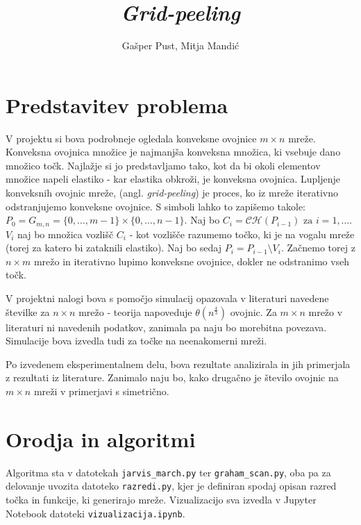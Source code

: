 \documentclass[a4paper]{article}
\title{\textit{Grid-peeling}}
\author{Gašper Pust, Mitja Mandić}
\begin{document}
\begin{titlepage}
 \maketitle
\end{titlepage}

\section{Predstavitev problema}
V projektu si bova podrobneje ogledala konveksne ovojnice $m \times n$ mreže. Konveksna ovojnica množice je najmanjša konveksna množica, ki vsebuje dano množico točk.
Najlažje si jo predstavljamo tako, kot da bi okoli elementov množice napeli elastiko - kar elastika obkroži, je konveksna ovojnica. Lupljenje konveksnih ovojnic mreže,
(angl. \textit{grid-peeling}) je proces, ko iz mreže iterativno odstranjujemo konveksne ovojnice. S simboli lahko to zapišemo takole:
$ P_{0} = G_{m,n} = \{0,\ldots, m-1\} \times \{0, \ldots, n-1\}$. Naj bo $C_{i} = \mathcal{C}\mathcal{H}(P_{i-1}) \text{ za } i = 1, \ldots$. $V_{i}$ naj bo množica vozlišč $C_{i}$
- kot vozlišče razumemo točko, ki je na vogalu mreže (torej za katero bi zataknili elastiko). Naj bo sedaj $P_{i} = P_{i-1} \setminus V_{i}$. Začnemo torej z $n \times m$ mrežo 
in iterativno lupimo konveksne ovojnice, dokler ne odstranimo vseh točk.

V projektni nalogi bova s pomočjo simulacij opazovala v literaturi navedene številke za $n \times n$ mrežo - teorija napoveduje $\theta(n ^ \frac{4}{3})$ ovojnic.
Za $m \times n$ mrežo v literaturi ni navedenih podatkov, zanimala pa naju bo morebitna povezava. Simulacije bova izvedla tudi za točke na neenakomerni mreži.

Po izvedenem eksperimentalnem delu, bova rezultate analizirala in jih primerjala z rezultati iz literature. Zanimalo naju bo, kako drugačno je število ovojnic na $m \times n$
mreži v primerjavi s simetrično.

\section{Orodja in algoritmi}
Algoritma sta v datotekah \texttt{jarvis\_march.py} ter \texttt{graham\_scan.py}, oba pa za delovanje uvozita datoteko \texttt{razredi.py}, kjer je definiran spodaj opisan
razred točka in funkcije, ki generirajo mreže. Vizualizacijo sva izvedla v Jupyter Notebook datoteki \texttt{vizualizacija.ipynb}.
\end{document}

